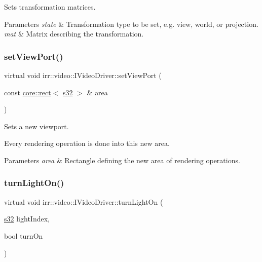 Sets transformation matrices. 


\begin{DoxyParams}{Parameters}
{\em state} & Transformation type to be set, e.\+g. view, world, or projection. \\
\hline
{\em mat} & Matrix describing the transformation. \\
\hline
\end{DoxyParams}
\mbox{\label{classirr_1_1video_1_1IVideoDriver_af03cf9b67bb7b43a8021bbe4baa78a08}} 
\subsubsection{\texorpdfstring{set\+View\+Port()}{setViewPort()}}
{\footnotesize\ttfamily virtual void irr\+::video\+::\+I\+Video\+Driver\+::set\+View\+Port (\begin{DoxyParamCaption}\item[{const \hyperlink{classirr_1_1core_1_1rect}{core\+::rect}$<$ \hyperlink{namespaceirr_ac66849b7a6ed16e30ebede579f9b47c6}{s32} $>$ \&}]{area }\end{DoxyParamCaption})\hspace{0.3cm}{\ttfamily [pure virtual]}}



Sets a new viewport. 

Every rendering operation is done into this new area. 
\begin{DoxyParams}{Parameters}
{\em area} & Rectangle defining the new area of rendering operations. \\
\hline
\end{DoxyParams}
\mbox{\label{classirr_1_1video_1_1IVideoDriver_a3c26904f7d1bf0e37d51fe71562346a0}} 
\subsubsection{\texorpdfstring{turn\+Light\+On()}{turnLightOn()}}
{\footnotesize\ttfamily virtual void irr\+::video\+::\+I\+Video\+Driver\+::turn\+Light\+On (\begin{DoxyParamCaption}\item[{\hyperlink{namespaceirr_ac66849b7a6ed16e30ebede579f9b47c6}{s32}}]{light\+Index,  }\item[{bool}]{turn\+On }\end{DoxyParamCaption})\hspace{0.3cm}{\ttfamily [pure virtual]}}



